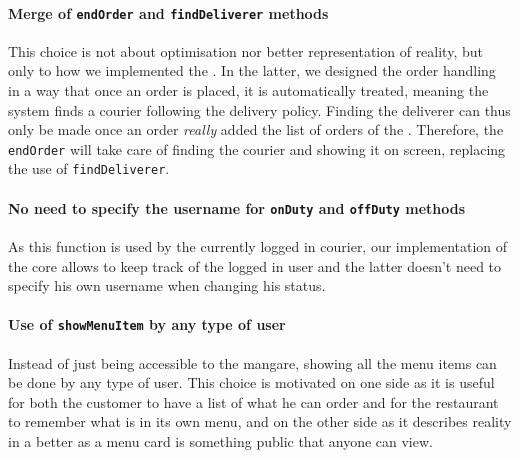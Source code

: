 \paragraph{Merge of \texttt{endOrder} and \texttt{findDeliverer} methods} %
\label{par:merge_of_endorder_and_finddeliverer}
This choice is not about optimisation nor better representation of reality,
but only to how we implemented the \Core.
In the latter, we designed the order handling in a way that once an order
is placed, it is automatically treated, meaning the system finds a courier
following the delivery policy.
Finding the deliverer can thus only be made once an order \emph{really}
added the list of orders of the \Core.
Therefore, the \lstinline|endOrder| will take care of finding the courier
and showing it on screen, replacing the use of \lstinline|findDeliverer|.

\paragraph{No need to specify the username for \texttt{onDuty}
and \texttt{offDuty} methods} %
\label{par:no_need_to_specify_the_username_for_lstinline_onduty_and_lstinline_offduty_methods}
As this function is used by the currently logged in courier,
our implementation of the core allows to keep track of the logged in user
and the latter doesn't need to specify his own username when changing his status.

\paragraph{Use of \texttt{showMenuItem} by any type of user} %
\label{par:use_of_lstinline_showmenuitem_by_any_type_of_user}
Instead of just being accessible to the mangare, showing all the menu
items can be done by any type of user.
This choice is motivated on one side as it is useful for both the customer
to have a list of what he can order and for the restaurant to remember what
is in its own menu, and on the other side as it describes reality in a better
as a menu card is something public that anyone can view.



